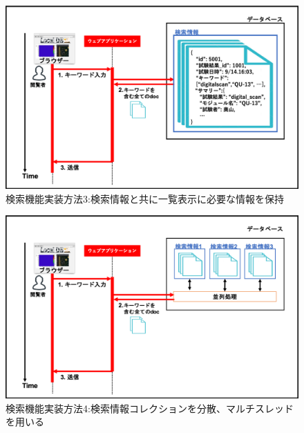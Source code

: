 \begin{figure}[bpt]
  \begin{center}
    \includegraphics[width=16cm]{search_summary_hash}
  \caption[検索機能実装方法3:検索情報と共に一覧表示に必要な情報を保持]{検索機能実装方法3:検索情報と共に一覧表示に必要な情報を保持}
  \label{search_summary_hash}
  \end{center}
\end{figure}

\begin{figure}[bpt]
  \begin{center}
    \includegraphics[width=16cm]{search_multi_thread}
  \caption[検索機能実装方法4:検索情報コレクションを分散、マルチスレッドを用いる]{検索機能実装方法4:検索情報コレクションを分散、マルチスレッドを用いる}
  \label{search_multi_thread}
  \end{center}
\end{figure}

